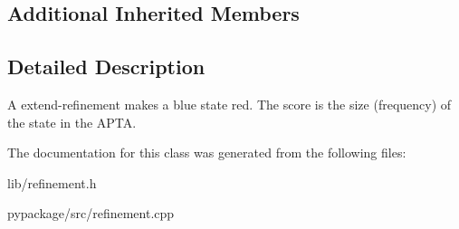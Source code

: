 \subsection*{Additional Inherited Members}


\subsection{Detailed Description}
A extend-\/refinement makes a blue state red. The score is the size (frequency) of the state in the A\+P\+TA. 

The documentation for this class was generated from the following files\+:\begin{DoxyCompactItemize}
\item 
lib/refinement.\+h\item 
pypackage/src/refinement.\+cpp\end{DoxyCompactItemize}
